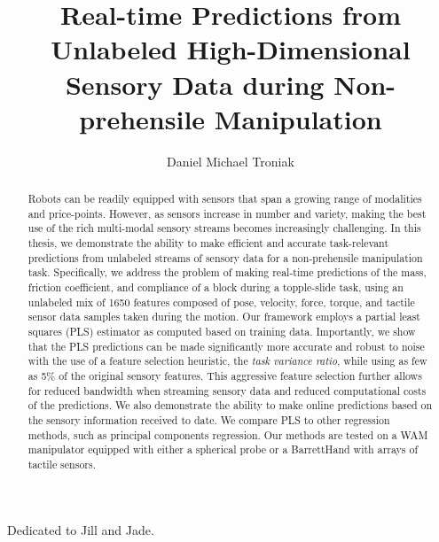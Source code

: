 \documentclass[msc,oneside]{ubcthesis}
\title{Real-time Predictions from Unlabeled High-Dimensional Sensory Data during Non-prehensile Manipulation}
\author{Daniel Michael Troniak}
\begin{document}
\frontmatter
\maketitle                      %

\begin{abstract}                %
Robots can be readily equipped with sensors that span a growing range of modalities and
price-points.  
However, as sensors increase in number and variety, making the best use of the rich multi-modal sensory streams becomes increasingly challenging. 
In this thesis, we demonstrate the ability to make efficient and accurate task-relevant predictions from unlabeled streams of sensory data for a non-prehensile manipulation task. Specifically, we address the problem of making real-time predictions of the mass, friction coefficient, and compliance of a block during a topple-slide task, using an unlabeled mix of 1650 features composed of pose, velocity, force, torque, and tactile sensor data samples taken during the motion. 
Our framework employs a partial least squares (PLS) estimator as computed based on training data. 
Importantly, we show that the PLS predictions can be made significantly more accurate and robust to noise with the use of a feature selection heuristic, the {\em task variance ratio}, while using as few as 5\% of the original sensory features. 
This aggressive feature selection further allows for reduced bandwidth when streaming sensory data and reduced computational costs of the predictions. 
We also demonstrate the ability to make online predictions based on the sensory information received to date. We compare PLS to other regression methods, such as principal components regression. 
Our methods are tested on a WAM manipulator equipped with either a spherical probe or a BarrettHand with arrays of tactile sensors.
\end{abstract}



\tableofcontents                %
\listoftables                   %
\listoffigures                  %



\chapter[Dedication]{} %
Dedicated to Jill and Jade.

\mainmatter %







%




\appendix

%

\backmatter

\end{document}

